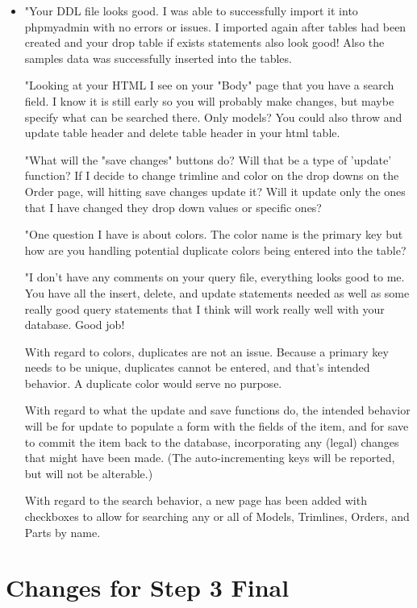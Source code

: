 \documentclass[11pt,letterpaper,oneside]{amsart}
\begin{document}
\begin{itemize}

\item "Your DDL file looks good. I was able to successfully import it into phpmyadmin with no errors or issues. I imported again after tables had been created and your drop table if exists statements also look good! Also the samples data was successfully inserted into the tables.

"Looking at your HTML I see on your "Body" page that you have a search field. I know it is still early so you will probably make changes, but maybe specify what can be searched there. Only models? You could also throw and update table header and delete table header in your html table.

"What will the "save changes" buttons do? Will that be a type of 'update' function? If I decide to change trimline and color on the drop downs on the Order page, will hitting save changes update it? Will it update only the ones that I have changed they drop down values or specific ones?

"One question I have is about colors. The color name is the primary key but how are you handling potential duplicate colors being entered into the table?

"I don't have any comments on your query file, everything looks good to me. You have all the insert, delete, and update statements needed as well as some really good query statements that I think will work really well with your database. Good job!

With regard to colors, duplicates are not an issue.  Because a primary key needs to be unique, duplicates cannot be entered, and that's intended behavior.  A duplicate color would serve no purpose.

With regard to what the update and save functions do, the intended behavior will be for update to populate a form with the fields of the item, and for save to commit the item back to the database, incorporating any (legal) changes that might have been made.  (The auto-incrementing keys will be reported, but will not be alterable.)

With regard to the search behavior, a new page has been added with checkboxes to allow for searching any or all of Models, Trimlines, Orders, and Parts by name.

\end{itemize}

\section*{Changes for Step 3 Final}
\end{document}
